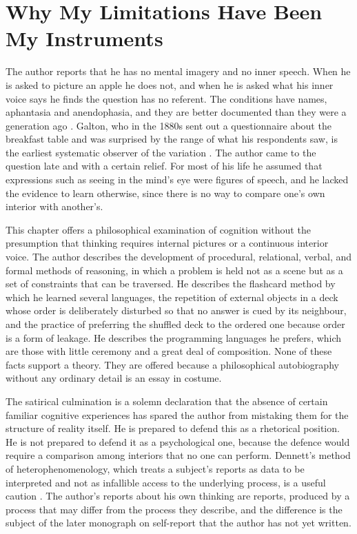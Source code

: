 \documentclass[11pt,openany,twoside]{book}
\theoremstyle{plain}
\theoremstyle{definition}
\theoremstyle{remark}
\begin{document}
\chapter{Why My Limitations Have Been My Instruments}

The author reports that he has no mental imagery and no inner speech. When he is asked to picture an apple he does not, and when he is asked what his inner voice says he finds the question has no referent. The conditions have names, aphantasia and anendophasia, and they are better documented than they were a generation ago \cite{zeman-imagery}. Galton, who in the 1880s sent out a questionnaire about the breakfast table and was surprised by the range of what his respondents saw, is the earliest systematic observer of the variation \cite{galton-imagery}. The author came to the question late and with a certain relief. For most of his life he assumed that expressions such as seeing in the mind's eye were figures of speech, and he lacked the evidence to learn otherwise, since there is no way to compare one's own interior with another's.

This chapter offers a philosophical examination of cognition without the presumption that thinking requires internal pictures or a continuous interior voice. The author describes the development of procedural, relational, verbal, and formal methods of reasoning, in which a problem is held not as a scene but as a set of constraints that can be traversed. He describes the flashcard method by which he learned several languages, the repetition of external objects in a deck whose order is deliberately disturbed so that no answer is cued by its neighbour, and the practice of preferring the shuffled deck to the ordered one because order is a form of leakage. He describes the programming languages he prefers, which are those with little ceremony and a great deal of composition. None of these facts support a theory. They are offered because a philosophical autobiography without any ordinary detail is an essay in costume.

The satirical culmination is a solemn declaration that the absence of certain familiar cognitive experiences has spared the author from mistaking them for the structure of reality itself. He is prepared to defend this as a rhetorical position. He is not prepared to defend it as a psychological one, because the defence would require a comparison among interiors that no one can perform. Dennett's method of heterophenomenology, which treats a subject's reports as data to be interpreted and not as infallible access to the underlying process, is a useful caution \cite{dennett-consciousness}. The author's reports about his own thinking are reports, produced by a process that may differ from the process they describe, and the difference is the subject of the later monograph on self-report that the author has not yet written.
\end{document}
